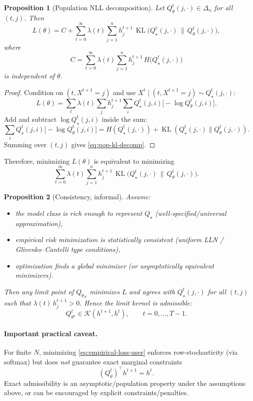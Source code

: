 \documentclass[11pt]{article}
\newcommand{\KL}{\operatorname{KL}}
\newcommand{\Kset}{\mathcal{K}}
\newtheorem{proposition}{Proposition}
\begin{document}
\begin{proposition}[Population NLL decomposition]
Let $Q_\theta^t(j,\cdot)\in\Delta_n$ for all $(t,j)$. Then
\begin{equation}
\label{eq:pop-kl-decomp}
L(\theta)=C+\sum_{t=0}^{\infty}\lambda(t)\sum_{j=1}^n h_j^{t+1}\,
\KL\!\big(Q_\star^t(j,\cdot)\,\|\,Q_\theta^t(j,\cdot)\big),
\end{equation}
where
\[
C=\sum_{t=0}^{\infty}\lambda(t)\sum_{j=1}^n h_j^{t+1}\,H\!\big(Q_\star^t(j,\cdot)\big)
\]
is independent of $\theta$.
\end{proposition}
\begin{proof}
Condition on $(t,X^{t+1}=j)$ and use $X^t\mid (t,X^{t+1}=j)\sim Q_\star^t(j,\cdot)$:
\[
L(\theta)=\sum_t \lambda(t)\sum_j h_j^{t+1}\sum_i
Q_\star^t(j,i)\big[-\log Q_\theta^t(j,i)\big].
\]
Add and subtract $\log Q_\star^t(j,i)$ inside the sum:
\[
\sum_i Q_\star^t(j,i)\big[-\log Q_\theta^t(j,i)\big]
=H(Q_\star^t(j,\cdot))
+\KL(Q_\star^t(j,\cdot)\|Q_\theta^t(j,\cdot)).
\]
Summing over $(t,j)$ gives \eqref{eq:pop-kl-decomp}.
\end{proof}

Therefore, minimizing $L(\theta)$ is equivalent to minimizing
\[
\sum_{t=0}^{\infty}\lambda(t)\sum_{j=1}^n h_j^{t+1}\,
\KL\!\big(Q_\star^t(j,\cdot)\,\|\,Q_\theta^t(j,\cdot)\big).
\]

\begin{proposition}[Consistency, informal]
Assume:
\begin{itemize}
\item the model class is rich enough to represent $Q_\star$ (well-specified/universal approximation),
\item empirical risk minimization is statistically consistent (uniform LLN / Glivenko--Cantelli type conditions),
\item optimization finds a global minimizer (or asymptotically equivalent minimizers).
\end{itemize}
Then any limit point of $Q_{\theta_N}$ minimizes $L$ and agrees with $Q_\star^t(j,\cdot)$ for all $(t,j)$ such that $\lambda(t)\,h_j^{t+1}>0$.
Hence the limit kernel is admissible:
\[
Q_{\theta^\star}^t\in\Kset(h^{t+1},h^t),\qquad t=0,\dots,T-1.
\]
\end{proposition}

\paragraph{Important practical caveat.}
For finite $N$, minimizing \eqref{eq:empirical-loss-user} enforces row-stochasticity (via softmax) but does \emph{not} guarantee exact marginal constraints
\[
(Q_\theta^t)^\top h^{t+1}=h^t.
\]
Exact admissibility is an asymptotic/population property under the assumptions above, or can be encouraged by explicit constraints/penalties.
\end{document}
